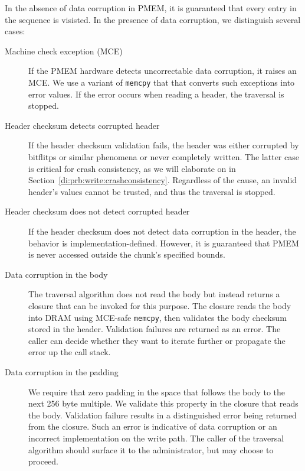 \documentclass[12pt,a4paper,twoside]{book}
\begin{document}
In the absence of data corruption in PMEM, it is guaranteed that every entry in the sequence is visisted.
In the presence of data corruption, we distinguish several cases:
\begin{description}
    \item[Machine check exception (MCE)] If the PMEM hardware detects uncorrectable data corruption, it raises an MCE.
        We use a variant of \lstinline{memcpy} that that converts such exceptions into error values.
        If the error occurs when reading a header, the traversal is stopped.
    \item[Header checksum detects corrupted header]
        If the header checksum validation fails, the header was either corrupted by bitflitps or similar phenomena or never completely written.
        The latter case is critical for crash consistency, as we will elaborate on in Section~\ref{di:prb:write:crashconsistency}.
        Regardless of the cause, an invalid header's values cannot be trusted, and thus the traversal is stopped.
    \item[Header checksum does not detect corrupted header]
        If the header checksum does not detect data corruption in the header, the behavior is implementation-defined.
        However, it is guaranteed that PMEM is never accessed outside the chunk's specified bounds.
    \item[Data corruption in the body]
        The traversal algorithm does not read the body but instead returns a closure that can be invoked for this purpose.
        The closure reads the body into DRAM using MCE-safe \lstinline{memcpy}, then validates the body checksum stored in the header.
        Validation failures are returned as an error.
        The caller can decide whether they want to iterate further or propagate the error up the call stack.
    \item[Data corruption in the padding]
        We require that zero padding in the space that follows the body to the next 256 byte multiple.
        We validate this property in the closure that reads the body.
        Validation failure results in a distinguished error being returned from the closure.
        Such an error is indicative of data corruption or an incorrect implementation on the write path.
        The caller of the traversal algorithm should surface it to the administrator, but may choose to proceed.
\end{description}
\end{document}
